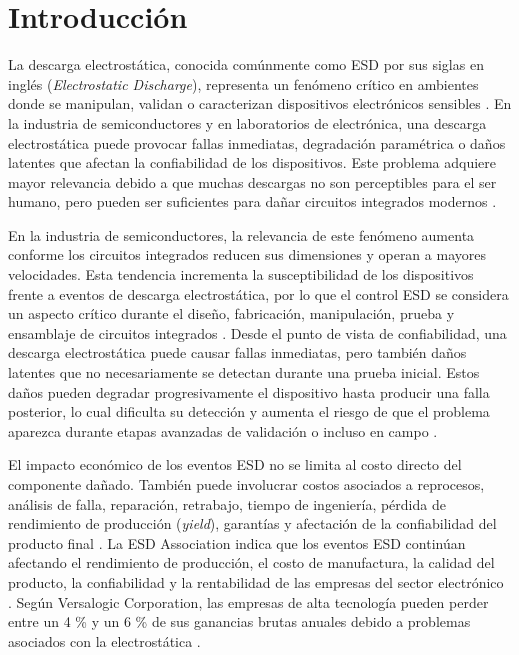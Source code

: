 \chapter{Introducción}

La descarga electrostática, conocida comúnmente como ESD por sus siglas en inglés
(\textit{Electrostatic Discharge}), representa un fenómeno crítico en ambientes donde se
manipulan, validan o caracterizan dispositivos electrónicos sensibles \cite{ESDAPrinciples2}.
En la industria de semiconductores y en laboratorios de electrónica, una descarga
electrostática puede provocar fallas inmediatas, degradación paramétrica o daños latentes
que afectan la confiabilidad de los dispositivos. Este problema adquiere mayor relevancia
debido a que muchas descargas no son perceptibles para el ser humano, pero pueden ser
suficientes para dañar circuitos integrados modernos \cite{TI2014}.

En la industria de semiconductores, la relevancia de este fenómeno aumenta conforme los
circuitos integrados reducen sus dimensiones y operan a mayores velocidades. Esta
tendencia incrementa la susceptibilidad de los dispositivos frente a eventos de descarga
electrostática, por lo que el control ESD se considera un aspecto crítico durante el diseño,
fabricación, manipulación, prueba y ensamblaje de circuitos integrados \cite{ESDA1}.
Desde el punto de vista de confiabilidad, una descarga electrostática puede causar fallas
inmediatas, pero también daños latentes que no necesariamente se detectan durante una
prueba inicial. Estos daños pueden degradar progresivamente el dispositivo hasta producir
una falla posterior, lo cual dificulta su detección y aumenta el riesgo de que el problema
aparezca durante etapas avanzadas de validación o incluso en campo \cite{TI2014}.

El impacto económico de los eventos ESD no se limita al costo directo del componente
dañado. También puede involucrar costos asociados a reprocesos, análisis de falla,
reparación, retrabajo, tiempo de ingeniería, pérdida de rendimiento de producción
(\textit{yield}), garantías y afectación de la confiabilidad del producto final
\cite{versalogic_esd}. La ESD Association indica que los eventos ESD continúan afectando
el rendimiento de producción, el costo de manufactura, la calidad del producto, la
confiabilidad y la rentabilidad de las empresas del sector electrónico \cite{ESDA1}. Según
Versalogic Corporation, las empresas de alta tecnología pueden perder entre un 4 \% y un
6 \% de sus ganancias brutas anuales debido a problemas asociados con la electrostática
\cite{versalogic_esd}.

